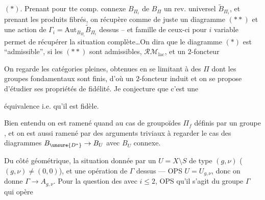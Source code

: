 $(*)$. Prenant pour tte comp. connexe $B_{\Pi_i}$ de $B_\Pi$ un rev. universel $\widetilde B_{\Pi_i}$, et prenant les produits fibrés, on récupère
comme de juste un diagramme
$(**)$
et une action de $\Gamma_i=\mathrm{Aut}_{B_{\Pi_i}}\widetilde B_{\Pi_i}$ dessus -- et   famille de ceux-ci pour $i$ variable permet de récupérer la situation complète\ldots On dira que le diagramme $(*)$ est ``admissible'', si les  $(**)$ sont admissibles,     $\mathcal{RM}_{\mathrm{lac}}$, et un $2$-foncteur

On regarde les  catégories pleines, obtenues en se limitant à des $\Pi$ dont les groupes fondamentaux sont finis, d'où un $2$-foncteur induit
et on se propose d'étudier ses propriétés de fidélité. Je conjecture que c'est une

équivalence  i.e. qu'il est  fidèle.

Bien entendu on est ramené quand  au cas de groupoïdes  \(\Pi_f\) définis par un groupe , et on est aussi ramené par des arguments  triviaux à regarder le cas des diagrammes \(B_{\unsure{D^*}}\to B_U\) avec \(B_U\) connexe.

Du côté géométrique, la situation  donnée par un \(U=X\setminus S\) de type \((g,\nu)\) (\((g,\nu)\ne(0,0)\)), et une opération de \(\Gamma\) dessus --- OPS \(U=U_{g,\nu}\), donc on donne \(\Gamma\to A_{g,\nu}\). Pour la question des  avec \(i\leq 2\), OPS qu'il s'agit du  groupe \(\Gamma\) qui opère\unsure{;} 

